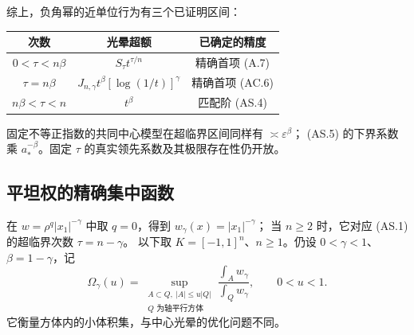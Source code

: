 综上，负角幂的近单位行为有三个已证明区间：
\begin{center}
\begin{tabular}{c|c|c}
次数 & 光晕超额 & 已确定的精度\\\hline
$0<\tau<n\beta$ & $S_\tau t^{\tau/n}$ & 精确首项 (A.7)\\
$\tau=n\beta$ & $J_{n,\gamma}t^\beta[\log(1/t)]^\gamma$ & 精确首项 (AC.6)\\
$n\beta<\tau<n$ & $t^\beta$ & 匹配阶 (AS.4)
\end{tabular}
\end{center}
固定不等正指数的共同中心模型在超临界区间同样有 $\asymp\varepsilon^\beta$；
(AS.5) 的下界系数乘 $a_*^{-\beta}$。固定 $\tau$ 的真实领先系数及其极限存在性仍开放。

\subsection{平坦权的精确集中函数}\label{subsec:flat-concentration}
在 $w=\rho^q|x_1|^{-\gamma}$ 中取 $q=0$，得到 $w_\gamma(x)=|x_1|^{-\gamma}$；
当 $n\ge2$ 时，它对应 (AS.1) 的超临界次数 $\tau=n-\gamma$。
以下取 $K=[-1,1]^n$、$n\ge1$。仍设 $0<\gamma<1$、$\beta=1-\gamma$，记
\[
 \Omega_\gamma(u)=\sup_{\substack{A\subset Q,\ |A|\le u|Q|\\Q\text{ 为轴平行方体}}}
 \frac{\int_Aw_\gamma}{\int_Qw_\gamma},\qquad 0<u<1.\tag{FC.1}
\]
它衡量方体内的小体积集，与中心光晕的优化问题不同。

